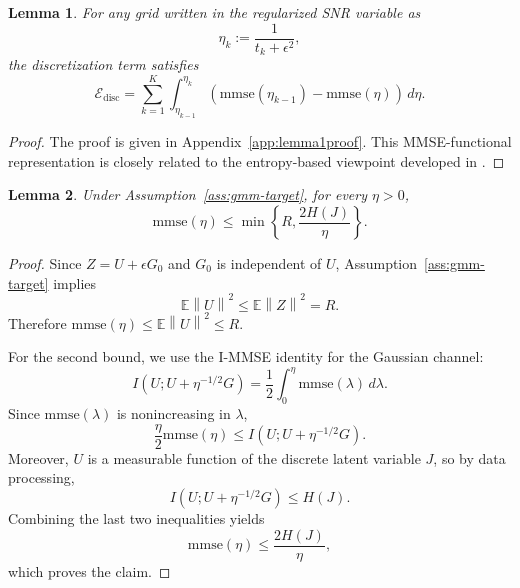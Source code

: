 \documentclass[11pt]{article}
\newtheorem{lemma}{Lemma}
\newcommand{\E}{\mathbb{E}}
\newcommand{\mmse}{\mathrm{mmse}}
\newcommand{\eps}{\epsilon}
\newcommand{\norm}[1]{\left\lVert #1 \right\rVert}
\begin{document}
\begin{lemma}
\label{lem:mmse-representation}
For any grid written in the regularized SNR variable as
\[
    \eta_k:=\frac1{t_k+\eps^2},
\]
the discretization term satisfies
\[
    \mathcal E_{\mathrm{disc}}
    =
    \sum_{k=1}^K
    \int_{\eta_{k-1}}^{\eta_k}
    \left(
    \mmse(\eta_{k-1})-\mmse(\eta)
    \right)\,d\eta .
\]
\end{lemma}

\begin{proof}
The proof is given in Appendix~\ref{app:lemma1proof}. This MMSE-functional
representation is closely related to the entropy-based viewpoint developed in
\cite{aghapour2026entropy}.
\end{proof}

\begin{lemma}
\label{lem:entropy-mmse}
Under Assumption~\ref{ass:gmm-target}, for every \(\eta>0\),
\[
    \mmse(\eta)
    \le
    \min\left\{
    R,\frac{2H(J)}{\eta}
    \right\}.
\]
\end{lemma}

\begin{proof}
Since \(Z=U+\eps G_0\) and \(G_0\) is independent of \(U\),
Assumption~\ref{ass:gmm-target} implies
\[
    \E\norm{U}^2\le \E\norm{Z}^2=R.
\]
Therefore
$\mmse(\eta)\le \E\norm{U}^2 \le R.$

For the second bound, we use the I-MMSE identity for the Gaussian channel:
\[
    I(U;U+\eta^{-1/2}G)
    =
    \frac12
    \int_0^\eta \mmse(\lambda)\,d\lambda .
\]
Since \(\mmse(\lambda)\) is nonincreasing in \(\lambda\),
\[
    \frac{\eta}{2}\mmse(\eta)
    \le
    I(U;U+\eta^{-1/2}G).
\]
Moreover, \(U\) is a measurable function of the discrete latent variable \(J\),
so by data processing,
\[
    I(U;U+\eta^{-1/2}G)\le H(J).
\]
Combining the last two inequalities yields
\[
    \mmse(\eta)\le \frac{2H(J)}{\eta},
\]
which proves the claim.
\end{proof}
\end{document}
